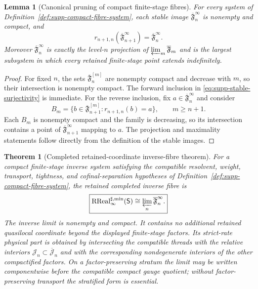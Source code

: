 \documentclass[11pt]{article}
\newtheorem{theorem}{Theorem}[section]
\newtheorem{lemma}[lemma]{Lemma}
\theoremstyle{definition}
\theoremstyle{remark}
\theoremstyle{definition}
\theoremstyle{remark}
\newcommand{\RReal}{\operatorname{RReal}}
\begin{document}
\begin{lemma}[Canonical pruning of compact finite-stage fibres]
\label{lem:supp-fibre-pruning}
For every system of Definition~\ref{def:supp-compact-fibre-system}, each stable
image $\overline{\mathfrak F}_n^\infty$ is nonempty and compact, and
\begin{equation}
 r_{n+1,n}(\overline{\mathfrak F}_{n+1}^\infty)
 =\overline{\mathfrak F}_n^\infty.
 \label{eq:supp-stable-surjectivity}
\end{equation}
Moreover $\overline{\mathfrak F}_n^\infty$ is exactly the level-$n$ projection of
$\varprojlim_m\overline{\mathfrak F}_m$ and is the largest subsystem in which every
retained finite-stage point extends indefinitely.
\end{lemma}

\begin{proof}
For fixed $n$, the sets
$\overline{\mathfrak F}_n^{[m]}$ are nonempty compact and decrease with $m$, so
their intersection is nonempty compact.  The forward inclusion in
\eqref{eq:supp-stable-surjectivity} is immediate.  For the reverse inclusion, fix
$a\in\overline{\mathfrak F}_n^\infty$ and consider
\[
 B_m=\{b\in\overline{\mathfrak F}_{n+1}^{[m]}:
       r_{n+1,n}(b)=a\},\qquad m\ge n+1.
\]
Each $B_m$ is nonempty compact and the family is decreasing, so its intersection
contains a point of $\overline{\mathfrak F}_{n+1}^\infty$ mapping to $a$.
The projection and maximality statements follow directly from the definition of
the stable images.
\end{proof}

\begin{theorem}[Completed retained-coordinate inverse-fibre theorem]
\label{thm:supp-semifinite-exhaustion}
For a compact finite-stage inverse system satisfying the compatible resolvent,
weight, transport, tightness, and cofinal-separation hypotheses of
Definition~\ref{def:supp-compact-fibre-system}, the retained completed inverse
fibre is
\begin{equation}
 \boxed{
 \RReal_\infty^{\sharp,\min}(\mathsf S)
 \cong
 \varprojlim_n\overline{\mathfrak F}_n^\infty.}
 \label{eq:supp-semifinite-fibre}
\end{equation}
The inverse limit is nonempty and compact.  It contains no additional retained
quasilocal coordinate beyond the displayed finite-stage factors.  Its strict-rate
physical part is obtained by intersecting the compatible threads with the relative
interiors $\mathcal J_n\subset\overline{\mathcal J}_n$ and with the corresponding
nondegenerate interiors of the other compactified factors.  On a factor-preserving
stratum the limit may be written componentwise before the compatible compact gauge
quotient; without factor-preserving transport the stratified form is essential.
\end{theorem}
\end{document}
